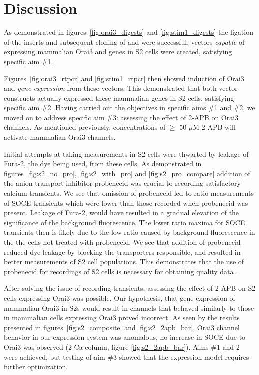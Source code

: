 \chapter{Discussion}

As demonstrated in figures~\ref{fig:orai3_digests} and \ref{fig:stim1_digests} the ligation of the inserts and subsequent cloning of \oraiiiivector{} and \stimivector{} were successful. \droso{} vectors \emph{capable} of expressing mammalian Orai3 and \stim{} genes in S2 cells were created, satisfying specific aim \#1. 

Figures~\ref{fig:orai3_rtpcr} and \ref{fig:stim1_rtpcr} then showed induction of Orai3 and \stim{} \emph{gene expression} from these vectors. This demonstrated that both vector constructs actually expressed these mammalian genes in \droso{} S2 cells, satisfying specific aim \#2. Having carried out the objectives in specific aims \#1 and \#2, we moved on to address specific aim \#3: assessing the effect of 2-APB on Orai3 channels. As mentioned previously, concentrations of $\ge$ 50 $\mu$M 2-APB will activate mammalian Orai3 channels.

Initial attempts at taking \Ca{} measurements in S2 cells were thwarted by leakage of Fura-2, the \Ca{} dye being used, from these cells. As demonstrated in figures~\ref{fig:s2_no_pro}, \ref{fig:s2_with_pro} and \ref{fig:s2_pro_compare} addition of the anion transport inhibitor probenecid was crucial to recording satisfactory calcium transients. We see that omission of probenecid led to ratio measurements of SOCE transients which were lower than those recorded when probenecid was present.  Leakage of Fura-2, would have resulted in a gradual elevation of the significance of the background fluorescence. The lower ratio maxima for SOCE transients then is likely due to the low ratio caused by background fluorescence in the the cells not treated with probenecid.
We see that addition of probenecid reduced dye leakage by blocking the transporters responsible, and resulted in better measurements of S2 cell populations. This demonstrates that the use of probenecid for \Ca{} recordings of \droso{} S2 cells is necessary for obtaining quality data \citep{Yagodin1999}. 
 
After solving the issue of recording \Ca{} transients, assessing the effect of 2-APB on S2 cells expressing Orai3 was possible. Our hypothesis, that gene expression of mammalian Orai3 in \droso{} S2s would result in \Ca{} channels that behaved similarly to those in mammalian cells expressing Orai3 proved incorrect. As seen by the results presented in figures~\ref{fig:s2_composite} and \ref{fig:s2_2apb_bar}, Orai3 channel behavior in our  \droso{} expression system was anomalous, no increase in SOCE due to Orai3 was observed (2 Ca column, figure \ref{fig:s2_2apb_bar}). Aims \#1 and 2 were achieved, but testing of aim \#3 showed that the expression model requires further optimization. 

